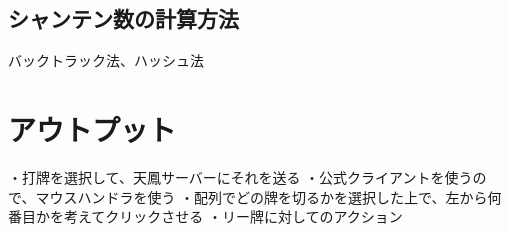 \subsection{シャンテン数の計算方法}
バックトラック法、ハッシュ法

\section{アウトプット}
・打牌を選択して、天鳳サーバーにそれを送る
・公式クライアントを使うので、マウスハンドラを使う
・配列でどの牌を切るかを選択した上で、左から何番目かを考えてクリックさせる
・リー牌に対してのアクション


